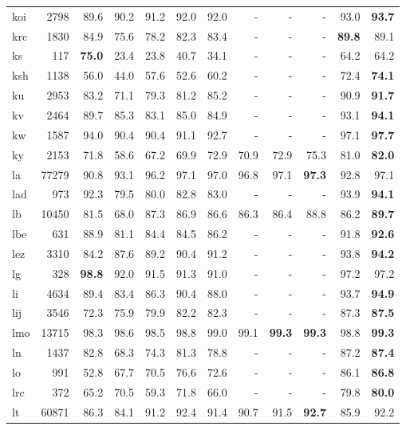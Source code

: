 \documentclass[11pt,a4paper]{article}
\begin{document}
\begin{supertabular}{lrrr|rrr|rrr|rr}
koi & 2798 & 89.6 & 90.2 & 91.2 & 92.0 & 92.0 & - & - & - & 93.0 & \textbf{93.7}\\
krc & 1830 & 84.9 & 75.6 & 78.2 & 82.3 & 83.4 & - & - & - & \textbf{89.8} & 89.1\\
ks & 117 & \textbf{75.0} & 23.4 & 23.8 & 40.7 & 34.1 & - & - & - & 64.2 & 64.2\\
ksh & 1138 & 56.0 & 44.0 & 57.6 & 52.6 & 60.2 & - & - & - & 72.4 & \textbf{74.1}\\
ku & 2953 & 83.2 & 71.1 & 79.3 & 81.2 & 85.2 & - & - & - & 90.9 & \textbf{91.7}\\
kv & 2464 & 89.7 & 85.3 & 83.1 & 85.0 & 84.9 & - & - & - & 93.1 & \textbf{94.1}\\
kw & 1587 & 94.0 & 90.4 & 90.4 & 91.1 & 92.7 & - & - & - & 97.1 & \textbf{97.7}\\
ky & 2153 & 71.8 & 58.6 & 67.2 & 69.9 & 72.9 & 70.9 & 72.9 & 75.3 & 81.0 & \textbf{82.0}\\
la & 77279 & 90.8 & 93.1 & 96.2 & 97.1 & 97.0 & 96.8 & 97.1 & \textbf{97.3} & 92.8 & 97.1\\
lad & 973 & 92.3 & 79.5 & 80.0 & 82.8 & 83.0 & - & - & - & 93.9 & \textbf{94.1}\\
lb & 10450 & 81.5 & 68.0 & 87.3 & 86.9 & 86.6 & 86.3 & 86.4 & 88.8 & 86.2 & \textbf{89.7}\\
lbe & 631 & 88.9 & 81.1 & 84.4 & 84.5 & 86.2 & - & - & - & 91.8 & \textbf{92.6}\\
lez & 3310 & 84.2 & 87.6 & 89.2 & 90.4 & 91.2 & - & - & - & 93.8 & \textbf{94.2}\\
lg & 328 & \textbf{98.8} & 92.0 & 91.5 & 91.3 & 91.0 & - & - & - & 97.2 & 97.2\\
li & 4634 & 89.4 & 83.4 & 86.3 & 90.4 & 88.0 & - & - & - & 93.7 & \textbf{94.9}\\
lij & 3546 & 72.3 & 75.9 & 79.9 & 82.2 & 82.3 & - & - & - & 87.3 & \textbf{87.5}\\
lmo & 13715 & 98.3 & 98.6 & 98.5 & 98.8 & 99.0 & 99.1 & \textbf{99.3} & \textbf{99.3} & 98.8 & \textbf{99.3}\\
ln & 1437 & 82.8 & 68.3 & 74.3 & 81.3 & 78.8 & - & - & - & 87.2 & \textbf{87.4}\\
lo & 991 & 52.8 & 67.7 & 70.5 & 76.6 & 72.6 & - & - & - & 86.1 & \textbf{86.8}\\
lrc & 372 & 65.2 & 70.5 & 59.3 & 71.8 & 66.0 & - & - & - & 79.8 & \textbf{80.0}\\
lt & 60871 & 86.3 & 84.1 & 91.2 & 92.4 & 91.4 & 90.7 & 91.5 & \textbf{92.7} & 85.9 & 92.2\\

\end{supertabular}
\end{document}
